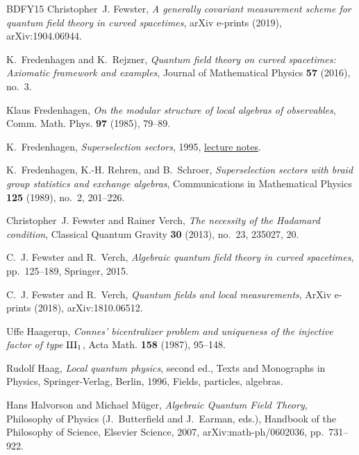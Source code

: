 \documentclass[12pt,a4paper]{article}
\newcommand{\1}{\mathds{1}}                         %
\begin{document}
{\begin{thebibliography}{BDFY15}
		Christopher~J. {Fewster}, \emph{{A generally covariant measurement scheme for
				quantum field theory in curved spacetimes}}, arXiv e-prints (2019),
		arXiv:1904.06944.
		
		K.~Fredenhagen and K.~Rejzner, \emph{Quantum field theory on curved spacetimes:
			{A}xiomatic framework and examples}, Journal of Mathematical Physics
		\textbf{57} (2016), no.~3.
		
		Klaus Fredenhagen, \emph{On the modular structure of local algebras of
			observables}, Comm. Math. Phys. \textbf{97} (1985), 79--89. 
		
		K.~Fredenhagen, \emph{Superselection sectors}, 1995,
		\href{https://unith.desy.de/sites/sites_custom/site_unith/content/e28509/e45341/e47501/e52578/Superselection.pdf}{lecture
			notes}.
		
		K.~Fredenhagen, K.-H. Rehren, and B.~Schroer, \emph{Superselection sectors with
			braid group statistics and exchange algebras}, Communications in Mathematical
		Physics \textbf{125} (1989), no.~2, 201--226.
		
		Christopher~J. Fewster and Rainer Verch, \emph{The necessity of the {H}adamard
			condition}, Classical Quantum Gravity \textbf{30} (2013), no.~23, 235027, 20.
		
		C.~J. Fewster and R.~Verch, \emph{Algebraic quantum field theory in curved
			spacetimes}, pp.~125--189, Springer, 2015.
		
		C.~J. {Fewster} and R.~{Verch}, \emph{{Quantum fields and local measurements}},
		ArXiv e-prints (2018), arXiv:1810.06512.
		
		Uffe Haagerup, \emph{Connes' bicentralizer problem and uniqueness of the
			injective factor of type {${\rm III}_1$}}, Acta Math. \textbf{158} (1987),
		95--148. 
		
		Rudolf Haag, \emph{Local quantum physics}, second ed., Texts and Monographs in
		Physics, Springer-Verlag, Berlin, 1996, Fields, particles, algebras.
		
		Hans {Halvorson} and Michael {M\"{u}ger}, \emph{{Algebraic Quantum Field
				Theory}}, Philosophy of Physics (J.~Butterfield and J.~Earman, eds.),
		Handbook of the Philosophy of Science, Elsevier Science, 2007,
		arXiv:math-ph/0602036, pp.~731--922.
		

\end{thebibliography}}
\end{document}
